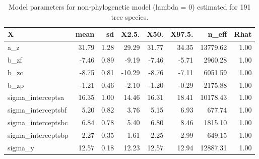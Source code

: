 \documentclass[11pt]{article}
\begin{document}
\begin{table}[ht]
\centering
\caption{Model parameters for non-phylogenetic model (lambda = 0) estimated for 191 tree species.} 
\label{tab:modlamb0}
\begingroup\footnotesize
\begin{tabular}{lrrrrrrr}
  \hline
X & mean & sd & X2.5. & X50. & X97.5. & n\_eff & Rhat \\ 
  \hline
a\_z & 31.79 & 1.28 & 29.29 & 31.77 & 34.35 & 13779.62 & 1.00 \\ 
  b\_zf & -7.46 & 0.89 & -9.19 & -7.46 & -5.71 & 2960.28 & 1.00 \\ 
  b\_zc & -8.75 & 0.81 & -10.29 & -8.76 & -7.11 & 6051.59 & 1.00 \\ 
  b\_zp & -1.21 & 0.46 & -2.10 & -1.20 & -0.29 & 2175.88 & 1.00 \\ 
  sigma\_interceptsa & 16.35 & 1.00 & 14.46 & 16.31 & 18.41 & 10178.43 & 1.00 \\ 
  sigma\_interceptsbf & 5.20 & 0.82 & 3.76 & 5.15 & 6.93 & 677.74 & 1.00 \\ 
  sigma\_interceptsbc & 6.84 & 0.78 & 5.40 & 6.80 & 8.46 & 1815.10 & 1.00 \\ 
  sigma\_interceptsbp & 2.27 & 0.35 & 1.61 & 2.25 & 2.99 & 649.15 & 1.00 \\ 
  sigma\_y & 12.57 & 0.18 & 12.23 & 12.57 & 12.94 & 12887.31 & 1.00 \\ 
  \end{tabular}
\endgroup
\end{table} \clearpage \pagebreak 
\end{document}
